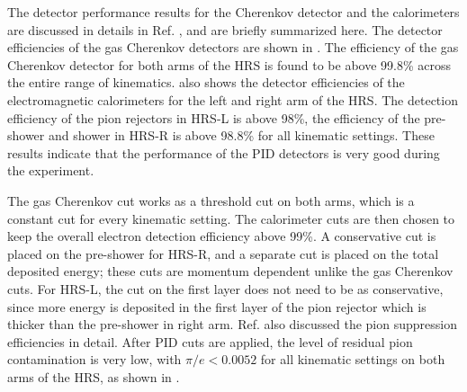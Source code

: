 The detector performance results for the Cherenkov detector and the calorimeters are discussed in details in Ref. \cite{Cummings2013}, and are briefly summarized here. The detector efficiencies of the gas Cherenkov detectors are shown in . The efficiency of the gas Cherenkov detector for both arms of the HRS is found to be above 99.8\% across the entire range of kinematics.  also shows the detector efficiencies of the electromagnetic calorimeters for the left and right arm of the HRS. The detection efficiency of the pion rejectors in HRS-L is above 98\%, the efficiency of the pre-shower and shower in HRS-R is above 98.8\% for all kinematic settings. These results indicate that the performance of the PID detectors is very good during the experiment.

The gas Cherenkov cut works as a threshold cut on both arms, which is a constant cut for every kinematic setting. The calorimeter cuts are then chosen to keep the overall electron detection efficiency above 99\%. A conservative cut is placed on the pre-shower for HRS-R, and a separate cut is placed on the total deposited energy; these cuts are momentum dependent unlike the gas Cherenkov cuts. For HRS-L, the cut on the first layer does not need to be as conservative, since more energy is deposited in the first layer of the pion rejector which is thicker than the pre-shower in right arm. Ref. \cite{Cummings2013} also discussed the pion suppression efficiencies in detail. After PID cuts are applied, the level of residual pion contamination is very low, with $\pi/e<0.0052$ for all kinematic settings on both arms of the HRS, as shown in .

